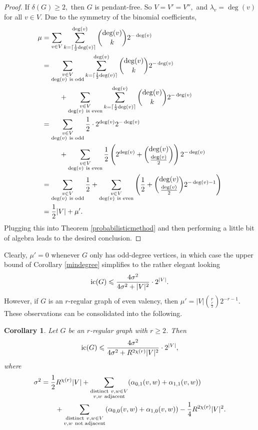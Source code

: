 \documentclass[11pt, reqno]{amsart}
\newtheorem{corollary}[theorem]{Corollary}
\theoremstyle{definition}
\renewcommand{\leq}{\leqslant}
\renewcommand{\geq}{\geqslant}
\begin{document}
\begin{proof}
If $\delta(G) \geq 2,$ then $G$ is pendant-free. So $V=V'=V'',$ and $\lambda_v = \deg(v)$ for all $v \in V.$ Due to the symmetry of the binomial coefficients,
\begin{align}
\mu &= \sum_{v \in V} \sum_{k = \lceil\frac{1}{2}\textup{deg}(v)\rceil}^{\deg(v)} \binom{\deg(v)}{k}2^{-\deg(v)}
\\ &= \sum_{\substack{v \in V \\ \text{deg}(v)\ \text{is odd}}} \sum_{k = \lceil\frac{1}{2}\textup{deg}(v)\rceil}^{\deg(v)} \binom{\deg(v)}{k}2^{-\deg(v)} \nonumber \\ &\hspace{2.5em}+ \sum_{\substack{v \in V \\ \text{deg}(v)\ \text{is even}}} \sum_{k = \lceil\frac{1}{2}\textup{deg}(v)\rceil}^{\deg(v)} \binom{\deg(v)}{k}2^{-\deg(v)}
\\ &= \sum_{\substack{v \in V \\ \text{deg}(v)\ \text{is odd}}} \frac{1}{2}\cdot2^{\deg(v)}2^{-\deg(v)} \nonumber \\ &\hspace{2.5em}+ \sum_{\substack{v \in V \\ \text{deg}(v)\ \text{is even}}} \frac{1}{2}\left(2^{\deg(v)}+\binom{\deg(v)}{\frac{\deg(v)}{2}}\right)2^{-\deg(v)}
\\ &= \sum_{\substack{v \in V \\ \text{deg}(v)\ \text{is odd}}} \frac{1}{2} + \sum_{\substack{v \in V \\ \text{deg}(v)\ \text{is even}}} \left(\frac{1}{2} + \binom{\deg(v)}{\frac{\deg(v)}{2}}2^{-\deg(v)-1}\right)
\\ &= \frac{1}{2}|V| + \mu'.
\end{align}
Plugging this into Theorem \ref{probabilisticmethod} and then performing a little bit of algebra leads to the desired conclusion.
\end{proof}

Clearly, $\mu'=0$ whenever $G$ only has odd-degree vertices, in which case the upper bound of Corollary \ref{mindegree} simplifies to the rather elegant looking
\[\textup{ic}(G) \leq \frac{4\sigma^2}{4\sigma^2+|V|^2}\cdot2^{|V|}.\]
However, if $G$ is an $r$-regular graph of even valency, then $\mu' = |V|\binom{r}{\frac{r}{2}}2^{-r-1}.$ These observations can be consolidated into the following.

\begin{corollary}
Let $G$ be an $r$-regular graph with $r \geq 2$. Then
\[\textup{ic}(G) \leq \frac{4\sigma^2}{4\sigma^2+R^{2\chi(r)}|V|^2}\cdot2^{|V|},\]
where
\begin{align*}
\sigma^2 &= \frac{1}{2}R^{\chi(r)}|V| + \sum_{\substack{\textup{distinct}\ v, w \in V \\ v,w\ \textup{adjacent}}}(\alpha_{0,1}(v,w) + \alpha_{1,1}(v,w)) 
\\ & \hspace{2em}+ \sum_{\substack{\textup{distinct}\ v, w \in V \\ v,w\ \textup{not adjacent}}} (\alpha_{0,0}(v,w) + \alpha_{1,0}(v,w)) - \frac{1}{4}R^{2\chi(r)}|V|^2.
\end{align*}
\end{corollary}
\end{document}
